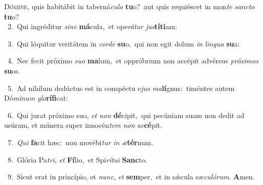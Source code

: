 \lettrine{\initial\textcolor{\initialcolor}{D}}{ómine,} quis habitábit in taberná\-\textit{cu}\-\textit{lo} \textbf{tu}\-o?~\star aut quis requiéscet in mon\textit{te} \textit{sanc}\-\textit{to} \textbf{tu}\-o?\\
{\numbfont\textcolor{\numbcolor}{~2.}}~Qui ingréditur \textit{si}\-\textit{ne} \textbf{má}\-cula,~\star et ope\-\textit{rá}\-\textit{tur} \textit{jus}\-\textbf{tí}\textbf{ti}am:\par
{\numbfont\textcolor{\numbcolor}{~3.}}~Qui lóquitur veritátem in \textit{cor}\-\textit{de} \textbf{su}\-o,~\star qui non egit dolum \textit{in} \textit{lin}\-\textit{gua} \textbf{su}\-a:\par
{\numbfont\textcolor{\numbcolor}{~4.}}~Nec fecit próximo \textit{su}\-\textit{o} \textbf{ma}\-lum,~\star et oppróbrium non accépit advérsus \textit{pró}\-\textit{xi}\textit{mos} \textbf{su}\-os.\par
{\numbfont\textcolor{\numbcolor}{~5.}}~Ad níhilum dedúctus est in conspéctu e\textit{jus} \textit{ma}\-\textbf{lí}gnus:~\star timéntes autem Dó\-\textit{mi}\-\textit{num} \textit{glo}\-\textbf{rí}\textbf{fi}cat:\par
{\numbfont\textcolor{\numbcolor}{~6.}}~Qui jurat próximo suo, \textit{et} \textit{non} \textbf{dé}\-cipit,~\star qui pecúniam suam non dedit ad usúram, et múnera super innocén\textit{tem} \textit{non} \textit{ac}\-\textbf{cé}pit.\par
{\numbfont\textcolor{\numbcolor}{~7.}}~\textit{Qui} \textbf{fa}\-cit hæc:~\star non movébi\textit{tur} \textit{in} \textit{æ}\-\textbf{tér}num.\par
{\numbfont\textcolor{\numbcolor}{~8.}}~Glória Pa\-\textit{tri}\-, \textit{et} \textbf{Fí}\-lio,~\star et Spi\-\textit{rí}\-\textit{tu}\textit{i} \textbf{Sanc}\-to.\par
{\numbfont\textcolor{\numbcolor}{~9.}}~Sicut erat in princípio, et \textit{nunc}\-, \textit{et} \textbf{sem}\-per,~\star et in sǽcula sæ\-\textit{cu}\-\textit{ló}\textit{rum}. \textbf{A}\-men.\par

